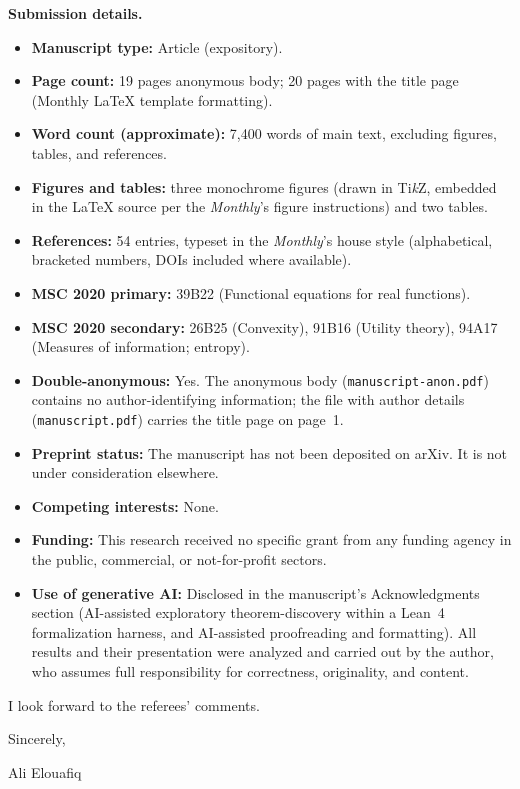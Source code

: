 \documentclass[12pt]{article}
\begin{document}
\bigskip
\noindent\textbf{Submission details.}
\begin{itemize}\setlength\itemsep{2pt}
  \item \textbf{Manuscript type:} Article (expository).
  \item \textbf{Page count:} 19 pages anonymous body; 20 pages with the
        title page (Monthly \LaTeX{} template formatting).
  \item \textbf{Word count (approximate):} 7{,}400 words of main text,
        excluding figures, tables, and references.
  \item \textbf{Figures and tables:} three monochrome figures (drawn in
        Ti\textit{k}Z, embedded in the \LaTeX{} source per the
        \emph{Monthly}'s figure instructions) and two tables.
  \item \textbf{References:} 54 entries, typeset in the \emph{Monthly}'s
        house style (alphabetical, bracketed numbers, DOIs included
        where available).
  \item \textbf{MSC 2020 primary:} 39B22 (Functional equations for real functions).
  \item \textbf{MSC 2020 secondary:} 26B25 (Convexity), 91B16 (Utility theory),
        94A17 (Measures of information; entropy).
  \item \textbf{Double-anonymous:} Yes. The anonymous body
        (\texttt{manuscript-anon.pdf}) contains no author-identifying
        information; the file with author details
        (\texttt{manuscript.pdf}) carries the title page on page~1.
  \item \textbf{Preprint status:} The manuscript has not been deposited on
        arXiv. It is not under consideration elsewhere.
  \item \textbf{Competing interests:} None.
  \item \textbf{Funding:} This research received no specific grant from any
        funding agency in the public, commercial, or not-for-profit
        sectors.
  \item \textbf{Use of generative AI:} Disclosed in the manuscript's
        Acknowledgments section (AI-assisted exploratory
        theorem-discovery within a Lean~4 formalization harness, and
        AI-assisted proofreading and formatting). All results and their
        presentation were analyzed and carried out by the author, who
        assumes full responsibility for correctness, originality, and
        content.
\end{itemize}

\bigskip
\noindent
I look forward to the referees' comments.

\bigskip
\noindent
Sincerely,

\vspace{28pt}
\noindent
Ali Elouafiq
\end{document}
